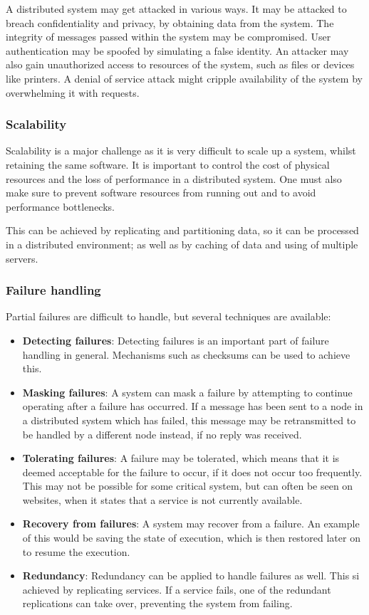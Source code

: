 \documentclass[a4paper]{article}
\begin{document}
A distributed system may get attacked in various ways. It may be attacked to breach confidentiality and privacy, by obtaining data from the system. The integrity of messages passed within the system may be compromised. User authentication may be spoofed by simulating a false identity. An attacker may also gain unauthorized access to resources of the system, such as files or devices like printers. A denial of service attack might cripple availability of the system by overwhelming it with requests.

\subsubsection{Scalability}

Scalability is a major challenge as it is very difficult to scale up a system, whilst retaining the same software. It is important to control the cost of physical resources and the loss of performance in a distributed system. One must also make sure to prevent software resources from running out and to avoid performance bottlenecks.

This can be achieved by replicating and partitioning data, so it can be processed in a distributed environment; as well as by caching of data and using of multiple servers.

\subsubsection{Failure handling}

Partial failures are difficult to handle, but several techniques are available:
\begin{itemize}
\item \textbf{Detecting failures}: Detecting failures is an important part of failure handling in general. Mechanisms such as checksums can be used to achieve this.
\item \textbf{Masking failures}: A system can mask a failure by attempting to continue operating after a failure has occurred. If a message has been sent to a node in a distributed system which has failed, this message may be retransmitted to be handled by a different node instead, if no reply was received.
\item \textbf{Tolerating failures}: A failure may be tolerated, which means that it is deemed acceptable for the failure to occur, if it does not occur too frequently. This may not be possible for some critical system, but can often be seen on websites, when it states that a service is not currently available.
\item \textbf{Recovery from failures}: A system may recover from a failure. An example of this would be saving the state of execution, which is then restored later on to resume the execution.
\item \textbf{Redundancy}: Redundancy can be applied to handle failures as well. This si achieved by replicating services. If a service fails, one of the redundant replications can take over, preventing the system from failing.
\end{itemize}
\end{document}
